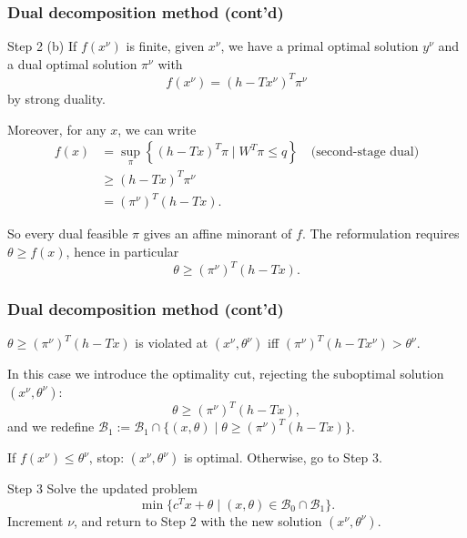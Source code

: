 \documentclass[aspectratio=169]{beamer}
\begin{document}
\begin{frame}
\frametitle{Dual decomposition method (cont'd)}

{\red Step 2 (b)}
If $f(x^{\nu})$ is finite, given $x^{\nu}$, we have a primal optimal solution $y^{\nu}$ and a dual optimal solution $\pi^{\nu}$ with
\[
f(x^{\nu}) = (h-Tx^{\nu})^T \pi^{\nu}
\]
by strong duality.

\vspace{1mm}

Moreover, for any $x$, we can write
\begin{align*}
f(x) &= \sup_{\pi} \left\lbrace (h-Tx)^T\pi \mid W^T\pi \leq q \right\rbrace \quad \text{(second-stage dual)}\\
&\geq (h-Tx)^T \pi^{\nu} \\
&= (\pi^{\nu})^T(h-Tx).
\end{align*}

So every dual feasible $\pi$ gives an affine {\red minorant} of $f$. The reformulation requires $\theta \geq f(x)$, hence in particular
\[
\theta \geq (\pi^{\nu})^T(h-Tx).
\]

\end{frame}

\begin{frame}
\frametitle{Dual decomposition method (cont'd)}

$\theta \geq (\pi^{\nu})^T(h-Tx)$ is violated at $(x^{\nu}, \theta^{\nu})$
iff $(\pi^{\nu})^T(h-Tx^{\nu}) > \theta^{\nu}$.

In this case we introduce the optimality cut, rejecting the suboptimal solution $(x^{\nu}, \theta^{\nu})$:
\[
\theta \geq (\pi^{\nu})^T (h-Tx),
\]
and we redefine $\mathcal{B}_1 := \mathcal{B}_1 \cap \lbrace (x, \theta) \mid \theta \geq (\pi^{\nu})^T (h-Tx) \rbrace$.

\mbox{}

If $f(x^{\nu}) \leq \theta^{\nu}$, stop: $(x^{\nu}, \theta^{\nu})$ is optimal.
Otherwise, go to Step 3.

\mbox{}

{\red Step 3}
Solve the updated problem
\[
\min \lbrace c^Tx + \theta \mid (x, \theta) \in \mathcal{B}_0 \cap \mathcal{B}_1 \rbrace.
\]
Increment $\nu$, and return to Step 2 with the new solution $(x^{\nu}, \theta^{\nu})$.

\end{frame}
\end{document}
